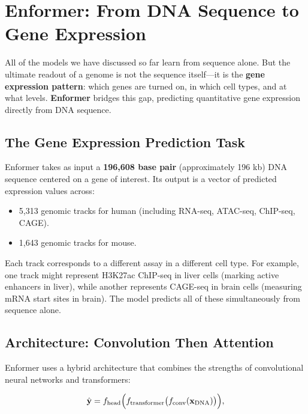 \section{Enformer: From DNA Sequence to Gene Expression}
\label{sec:enformer}

All of the models we have discussed so far learn from sequence alone. But the ultimate readout of a genome is not the sequence itself---it is the \textbf{gene expression pattern}: which genes are turned on, in which cell types, and at what levels. \textbf{Enformer} \citep{avsec2021} bridges this gap, predicting quantitative gene expression directly from DNA sequence.

\subsection{The Gene Expression Prediction Task}

Enformer takes as input a \textbf{196,608 base pair} (approximately 196 kb) DNA sequence centered on a gene of interest. Its output is a vector of predicted expression values across:
\begin{itemize}[leftmargin=1.5em]
  \item 5,313 genomic tracks for human (including RNA-seq, ATAC-seq, ChIP-seq, CAGE).
  \item 1,643 genomic tracks for mouse.
\end{itemize}

Each track corresponds to a different assay in a different cell type. For example, one track might represent H3K27ac ChIP-seq in liver cells (marking active enhancers in liver), while another represents CAGE-seq in brain cells (measuring mRNA start sites in brain). The model predicts all of these simultaneously from sequence alone.

\subsection{Architecture: Convolution Then Attention}

Enformer uses a hybrid architecture that combines the strengths of convolutional neural networks and transformers:

\begin{equation}
\hat{\mathbf{y}} = f_{\mathrm{head}}\Bigl(f_{\mathrm{transformer}}\bigl(f_{\mathrm{conv}}(\mathbf{x}_{\mathrm{DNA}})\bigr)\Bigr),
\label{eq:enformer}
\end{equation}

